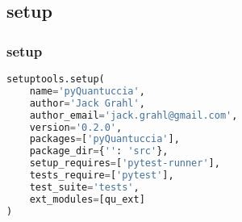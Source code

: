 \documentclass{beamer}
\begin{document}
	\subsection{setup}
	\begin{frame}[fragile]
		\frametitle{setup}
		\begin{lstlisting}[language=Python]
setuptools.setup(
    name='pyQuantuccia',
    author='Jack Grahl',
    author_email='jack.grahl@gmail.com',
    version='0.2.0',
    packages=['pyQuantuccia'],
    package_dir={'': 'src'},
    setup_requires=['pytest-runner'],
    tests_require=['pytest'],
    test_suite='tests',
    ext_modules=[qu_ext]
)		\end{lstlisting}
	\end{frame}
\end{document}
